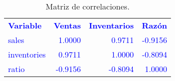 \begin{table}[H]
\centering
\caption{Matriz de correlaciones.}
\label{tab:ex8_corr}
\begin{tabular}{lrrr}
\rowcolor{blue!10}
\toprule
\rowcolor{blue!20}
\textcolor{blue}{\textbf{Variable}} & \textcolor{blue}{\textbf{Ventas}} & \textcolor{blue}{\textbf{Inventarios}} & \textcolor{blue}{\textbf{Razón}} \\
\addlinespace
\rowcolor{blue!10}
\textcolor{blue}{sales} & \textcolor{blue}{1.0000} & \textcolor{blue}{0.9711} & \textcolor{blue}{-0.9156} \\
\rowcolor{blue!10}
\textcolor{blue}{inventories} & \textcolor{blue}{0.9711} & \textcolor{blue}{1.0000} & \textcolor{blue}{-0.8094} \\
\rowcolor{blue!10}
\textcolor{blue}{ratio} & \textcolor{blue}{-0.9156} & \textcolor{blue}{-0.8094} & \textcolor{blue}{1.0000} \\
\bottomrule
\end{tabular}
\end{table}
